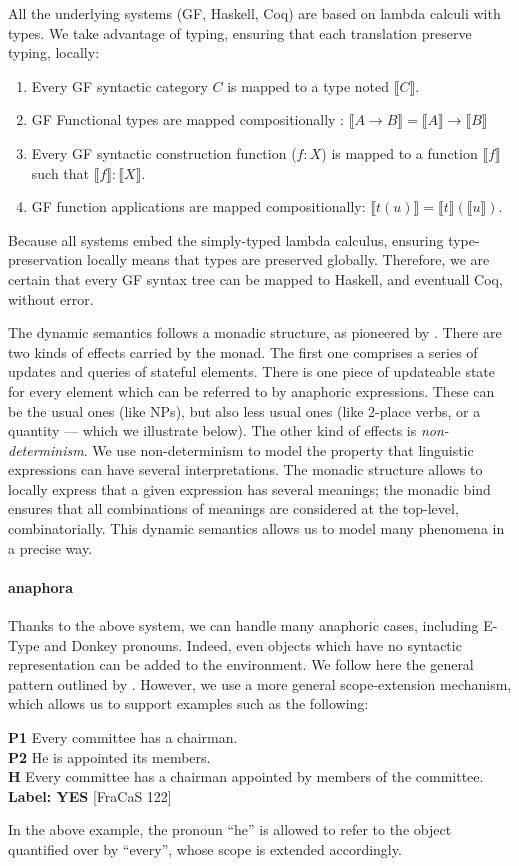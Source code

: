 \documentclass[11pt]{article}
\begin{document}
All the underlying systems (GF, Haskell, Coq) are based on lambda
calculi with types. We take advantage of typing, ensuring that each
translation preserve typing, locally:
\begin{enumerate}
\item Every GF syntactic category $C$ is mapped to a type noted $⟦C⟧$.
\item GF Functional types are mapped compositionally : $⟦A → B⟧ = ⟦A⟧ → ⟦B⟧$
\item Every GF syntactic construction function ($f : X$) is mapped to a function $⟦f⟧$ such that $⟦f⟧ : ⟦X⟧$.
\item GF function applications are mapped compositionally: $⟦t(u)⟧ = ⟦t⟧ (⟦u⟧)$.
\end{enumerate}
Because all systems embed the simply-typed lambda calculus, ensuring
type-preservation locally means that types are preserved globally.
Therefore, we are certain that every GF syntax tree can be mapped to
Haskell, and eventuall Coq, without error.

The dynamic semantics follows a monadic structure, as pioneered by
\citet{Shan:2002}. There are two kinds of effects carried by the
monad.  The first one comprises a series of updates and queries of
stateful elements.  There is one piece of updateable state for every
element which can be referred to by anaphoric expressions. These can
be the usual ones (like NPs), but also less usual ones (like 2-place
verbs, or a quantity --- which we illustrate below). The other kind of
effects is \emph{non-determinism}. We use non-determinism to model the
property that linguistic expressions can have several
interpretations. The monadic structure allows to locally express that
a given expression has several meanings; the monadic bind ensures that
all combinations of meanings are considered at the top-level,
combinatorially. This dynamic semantics allows us to model many
phenomena in a precise way.

\paragraph{anaphora} Thanks to the above system, we can handle many
anaphoric cases, including E-Type and Donkey pronouns. Indeed, even
objects which have no syntactic representation can be added to the
environment. We follow here the general pattern outlined by
\citet{unger:2011}. However, we use a more general scope-extension
mechanism, which allows us to support examples such as the following:
\begin{lingex}
\item
    \label{ex:anaphora-scope}
\textbf{P1}	Every committee has a chairman.\\
\textbf{P2}	He is appointed its members.\\
\textbf{H} 	Every committee has a chairman appointed by members of the committee. \\ \textbf{Label:	YES} [FraCaS 122]
\end{lingex}
In the above example, the pronoun ``he'' is allowed to refer to the
object quantified over by ``every'', whose scope is extended
accordingly.
\end{document}

